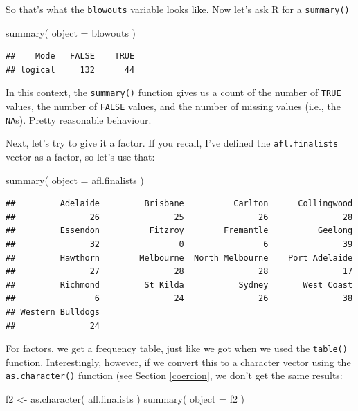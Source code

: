 \documentclass[
]{book}
\newenvironment{Shaded}{\begin{snugshade}}{\end{snugshade}}
\newcommand{\AttributeTok}[1]{\textcolor[rgb]{0.77,0.63,0.00}{#1}}
\newcommand{\FunctionTok}[1]{\textcolor[rgb]{0.00,0.00,0.00}{#1}}
\newcommand{\NormalTok}[1]{#1}
\newcommand{\OtherTok}[1]{\textcolor[rgb]{0.56,0.35,0.01}{#1}}
\begin{document}
So that's what the \texttt{blowouts} variable looks like. Now let's ask R for a \texttt{summary()}

\begin{Shaded}
\begin{Highlighting}[]
\FunctionTok{summary}\NormalTok{( }\AttributeTok{object =}\NormalTok{ blowouts )}
\end{Highlighting}
\end{Shaded}

\begin{verbatim}
##    Mode   FALSE    TRUE 
## logical     132      44
\end{verbatim}

In this context, the \texttt{summary()} function gives us a count of the number of \texttt{TRUE} values, the number of \texttt{FALSE} values, and the number of missing values (i.e., the \texttt{NA}s). Pretty reasonable behaviour.

Next, let's try to give it a factor. If you recall, I've defined the \texttt{afl.finalists} vector as a factor, so let's use that:

\begin{Shaded}
\begin{Highlighting}[]
\FunctionTok{summary}\NormalTok{( }\AttributeTok{object =}\NormalTok{ afl.finalists )}
\end{Highlighting}
\end{Shaded}

\begin{verbatim}
##         Adelaide         Brisbane          Carlton      Collingwood 
##               26               25               26               28 
##         Essendon          Fitzroy        Fremantle          Geelong 
##               32                0                6               39 
##         Hawthorn        Melbourne  North Melbourne    Port Adelaide 
##               27               28               28               17 
##         Richmond         St Kilda           Sydney       West Coast 
##                6               24               26               38 
## Western Bulldogs 
##               24
\end{verbatim}

For factors, we get a frequency table, just like we got when we used the \texttt{table()} function. Interestingly, however, if we convert this to a character vector using the \texttt{as.character()} function (see Section \ref{coercion}, we don't get the same results:

\begin{Shaded}
\begin{Highlighting}[]
\NormalTok{f2 }\OtherTok{\textless{}{-}} \FunctionTok{as.character}\NormalTok{( afl.finalists )}
\FunctionTok{summary}\NormalTok{( }\AttributeTok{object =}\NormalTok{ f2 )}
\end{Highlighting}
\end{Shaded}
\end{document}
